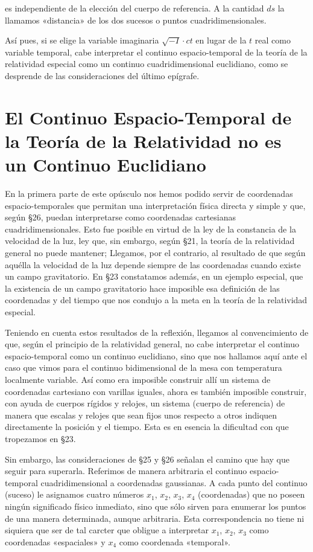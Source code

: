 \documentclass[spanish]{book}
\begin{document}
\noindent es independiente de la elección del cuerpo de referencia. A la cantidad $ds$ la llamamos
«distancia» de los dos sucesos o puntos cuadridimensionales.

Así pues, si se elige la variable imaginaria $\sqrt{-I}\cdot ct$
en lugar de la $t$ real como variable temporal, cabe interpretar el continuo espacio-temporal
de la teoría de la relatividad especial como un continuo cuadridimensional
euclidiano, como se desprende de las consideraciones del último epígrafe.


\chapter{El Continuo Espacio-Temporal de la Teoría de la Relatividad no es un
Continuo Euclidiano}

En la primera parte de este opúsculo nos hemos podido servir de coordenadas
espacio-temporales que permitan una interpretación física directa y simple y que,
según \S 26, puedan interpretarse como coordenadas cartesianas cuadridimensionales.
Esto fue posible en virtud de la ley de la constancia de la velocidad de la luz, ley que,
sin embargo, según \S 21, la teoría de la relatividad general no puede mantener;
Llegamos, por el contrario, al resultado de que según aquélla la velocidad de la luz
depende siempre de las coordenadas cuando existe un campo gravitatorio. En \S 23
constatamos además, en un ejemplo especial, que la existencia de un campo
gravitatorio hace imposible esa definición de las coordenadas y del tiempo que nos
condujo a la meta en la teoría de la relatividad especial.

Teniendo en cuenta estos resultados de la reflexión, llegamos al convencimiento de
que, según el principio de la relatividad general, no cabe interpretar el continuo
espacio-temporal como un continuo euclidiano, sino que nos hallamos aquí ante el
caso que vimos para el continuo bidimensional de la mesa con temperatura localmente
variable. Así como era imposible construir allí un sistema de coordenadas cartesiano
con varillas iguales, ahora es también imposible construir, con ayuda de cuerpos
rígidos y relojes, un sistema (cuerpo de referencia) de manera que escalas y relojes que
sean fijos unos respecto a otros indiquen directamente la posición y el tiempo. Esta es
en esencia la dificultad con que tropezamos en \S 23.

Sin embargo, las consideraciones de \S 25 y \S 26 señalan el camino que hay que seguir
para superarla. Referimos de manera arbitraria el continuo espacio-temporal
cuadridimensional a coordenadas gaussianas. A cada punto del continuo (suceso) le
asignamos cuatro números $x_{1}$, $x_{2}$, $x_{3}$, $x_{4}$ (coordenadas) que no poseen ningún
significado físico inmediato, sino que sólo sirven para enumerar los puntos de una
manera determinada, aunque arbitraria. Esta correspondencia no tiene ni siquiera que
ser de tal carcter que obligue a interpretar $x_{1}$, $x_{2}$, $x_{3}$ como coordenadas «espaciales» y
$x_{4}$ como coordenada «temporal».
\end{document}
